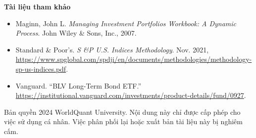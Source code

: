 \textbf{Tài liệu tham khảo}

\begin{itemize}
  \item Maginn, John L. \emph{Managing Investment Portfolios Workbook: A Dynamic Process}. John Wiley \& Sons, Inc., 2007.
  \item Standard \& Poor's. \emph{S \&P U.S. Indices Methodology}. Nov. 2021, \url{https://www.spglobal.com/spdji/en/documents/methodologies/methodology-sp-us-indices.pdf}.
  \item Vanguard. ``BLV Long-Term Bond ETF.'' \url{https://institutional.vanguard.com/investments/product-details/fund/0927}.
\end{itemize}
Bản quyền 2024 WorldQuant University. Nội dung này chỉ được cấp phép cho việc sử dụng cá nhân. Việc phân phối lại hoặc xuất bản tài liệu này bị nghiêm cấm.
